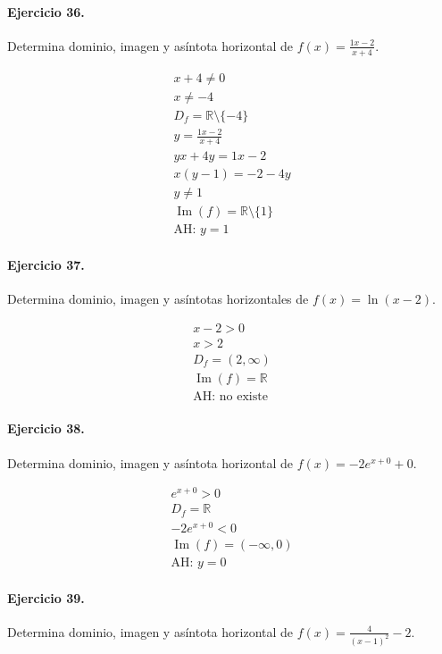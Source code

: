 \documentclass[11pt,a4paper]{article}
\begin{document}
\paragraph{Ejercicio 36.} Determina dominio, imagen y asíntota horizontal de $f(x)=\frac{1x-2}{x+4}$.

\[
\begin{aligned}
x+4\ne0\\
x\ne -4\\
D_f=\mathbb{R}\setminus\{-4\}\\
y=\frac{1x-2}{x+4}\\
yx+4y=1x-2\\
x(y-1)=-2-4y\\
y\ne 1\\
\operatorname{Im}(f)=\mathbb{R}\setminus\{1\}\\
\text{AH: }y=1
\end{aligned}
\]


\paragraph{Ejercicio 37.} Determina dominio, imagen y asíntotas horizontales de $f(x)=\ln(x-2)$.

\[
\begin{aligned}
x-2>0\\
x>2\\
D_f=(2,\infty)\\
\operatorname{Im}(f)=\mathbb{R}\\
\text{{AH: no existe}}
\end{aligned}
\]


\paragraph{Ejercicio 38.} Determina dominio, imagen y asíntota horizontal de $f(x)=-2e^{x+0}+0$.

\[
\begin{aligned}
e^{x+0}>0\\
D_f=\mathbb{R}\\
-2e^{x+0}<0\\
\operatorname{Im}(f)=(-\infty,0)\\
\text{AH: }y=0
\end{aligned}
\]


\paragraph{Ejercicio 39.} Determina dominio, imagen y asíntota horizontal de $f(x)=\frac{4}{(x-1)^2}-2$.
\end{document}
